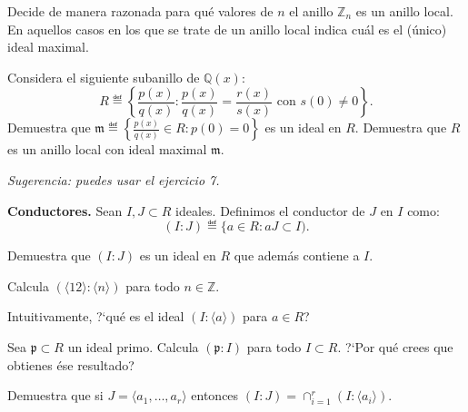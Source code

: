 \begin{problem}
Decide de manera razonada para qué valores de $n$ el anillo ${\mathbb Z}_n$ es un anillo local. En aquellos casos en los que se trate de un anillo local indica cuál es el (único) ideal maximal.
\solution
\end{problem}

\begin{problem}
Considera el siguiente subanillo de ${\mathbb Q}(x)$:
$$R ≝\left\{\frac{p(x)}{q(x)}: \frac{p(x)}{q(x)} =\frac{r(x)}{s(x)} \text{ con }  s(0)\neq 0\right\}. $$
\ppart  Demuestra que  ${\mathfrak m} ≝ \left\{\frac{p(x)}{q(x)}\in R: p(0)=0\right\}$ es un ideal en $R$.
\ppart  Demuestra que $R$ es un anillo local con ideal maximal $\mathfrak m$.

{\em Sugerencia: puedes usar el ejercicio 7.}
\solution
\end{problem}

\begin{problem}
{\bfseries Conductores.}
Sean $I, J\subset R$ ideales. Definimos el conductor de $J$ en $I$  como:
$$(I:J) ≝\{a\in R: aJ\subset I).$$

\ppart Demuestra que $(I:J)$ es un ideal en $R$ que además contiene a $I$.

\ppart Calcula $(\langle 12\rangle : \langle n \rangle)$ para todo  $n\in {\mathbb Z}$.

\ppart Intuitivamente,  ?`qué es el ideal $(I: \langle a\rangle)$ para $a\in R$?

\ppart Sea ${\mathfrak p}\subset R$ un ideal primo. Calcula $({\mathfrak p}: I)$ para todo $I\subset R$.
?`Por qué crees que obtienes ése   resultado?

\ppart Demuestra que si $J=\langle a_1,\ldots, a_r\rangle$ entonces $(I:J)=\cap_{i=1}^r(I: \langle a_i\rangle).$
\solution
\end{problem}
